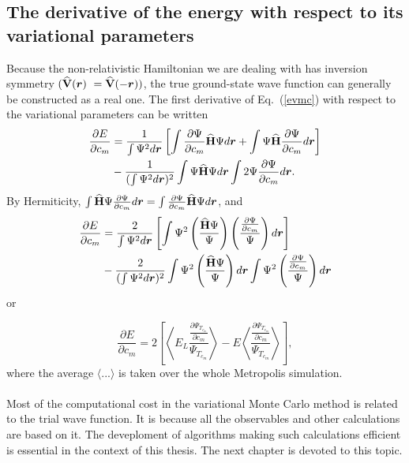 \subsection{The derivative of the energy with respect to its variational parameters}
Because the non-relativistic Hamiltonian we are dealing with has inversion symmetry $({\bf\widehat{V}}(\boldsymbol{r})~={\bf\widehat{V}}(-\boldsymbol{r}))$, the true ground-state wave function can generally be constructed as a real one\cite{Levi2006,Lin2008}. The first derivative of Eq.~(\ref{evmc}) with respect to the variational parameters can be written 
\begin{align*}
\frac{\partial E}{\partial c_m} & = \frac{1}{\int \Psi^2 d\boldsymbol{r}}\left[\int\frac{\partial \Psi}{\partial c_m} {\bf\widehat{H}} \Psi d\boldsymbol{r} +  \int \Psi {\bf\widehat{H}} \frac{\partial \Psi}{\partial c_m}  d\boldsymbol{r}\right]\\ &- \frac{1}{(\int \Psi^2 d\boldsymbol{r})^2} \int \Psi {\bf\widehat{H}} \Psi d\boldsymbol{r} \int 2 \Psi \frac{\partial \Psi}{\partial c_m} d\boldsymbol{r}.
\end{align*}
By Hermiticity, $\int {\bf\widehat{H}} \Psi \frac{\partial \Psi}{\partial c_m}  d\boldsymbol{r} = \int\frac{\partial \Psi}{\partial c_m} {\bf\widehat{H}} \Psi d\boldsymbol{r}$, and
\begin{align*}
\frac{\partial E}{\partial c_m} & = \frac{2}{\int \Psi^2 d\boldsymbol{r}}\left[\int {\Psi^2} \left(\frac{{\bf\widehat{H}} \Psi}{{\Psi}}\right) \left(\frac{\frac{\partial \Psi}{\partial c_m}}{\Psi} \right)d\boldsymbol{r} \right]\\ &- \frac{2}{(\int \Psi^2 d\boldsymbol{r})^2} \int \Psi^2 \left(\frac{{\bf\widehat{H}} \Psi}{\Psi}\right) d\boldsymbol{r} \int \Psi^2 \left(\frac{\frac{\partial \Psi}{\partial c_m}}{\Psi} \right) d\boldsymbol{r}
\end{align*}
or

\begin{equation}\label{definition}
\frac{\partial E}{\partial c_m} = 2\left[\left\langle E_L \frac{\frac{\partial \Psi_{T_{c_m}}}{\partial c_m}}{\Psi_{T_{c_m}}}\right\rangle - E \left\langle \frac{\frac{\partial \Psi_{T_{c_m}}}{\partial c_m}}{\Psi_{T_{c_m}}}\right\rangle \right],
\end{equation}
where the average $\langle ... \rangle$ is taken over the whole Metropolis simulation\cite{Lin2008}.\\
\\
\noindent
Most of the computational cost in the variational Monte Carlo method is related to the trial wave function. It is because all the observables and other calculations are based on it. The deveploment of algorithms making such calculations efficient is essential in the context of this thesis. The next chapter is devoted to this topic. 



